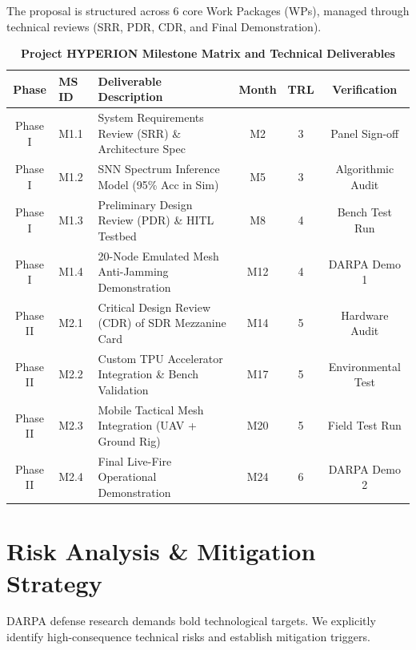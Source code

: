 \documentclass[10pt,a4paper]{article}
\begin{document}
The proposal is structured across 6 core Work Packages (WPs), managed through technical reviews (SRR, PDR, CDR, and Final Demonstration).

\vspace{2pt}

\begin{table}[h!]
\centering
\caption{\color{NavyPrimary}\bfseries Project HYPERION Milestone Matrix and Technical Deliverables}
\vspace{2pt}
\small
\begin{tabularx}{\linewidth}{@{}c l X c c c@{}}
\toprule
\rowcolor{LightBg}
\textbf{Phase} & \textbf{MS ID} & \textbf{Deliverable Description} & \textbf{Month} & \textbf{TRL} & \textbf{Verification} \\
\midrule
Phase I & M1.1 & System Requirements Review (SRR) \& Architecture Spec & M2 & 3 & Panel Sign-off \\
Phase I & M1.2 & SNN Spectrum Inference Model (95\% Acc in Sim) & M5 & 3 & Algorithmic Audit \\
Phase I & M1.3 & Preliminary Design Review (PDR) \& HITL Testbed & M8 & 4 & Bench Test Run \\
Phase I & M1.4 & 20-Node Emulated Mesh Anti-Jamming Demonstration & M12 & 4 & DARPA Demo 1 \\
\midrule
Phase II & M2.1 & Critical Design Review (CDR) of SDR Mezzanine Card & M14 & 5 & Hardware Audit \\
Phase II & M2.2 & Custom TPU Accelerator Integration \& Bench Validation & M17 & 5 & Environmental Test \\
Phase II & M2.3 & Mobile Tactical Mesh Integration (UAV + Ground Rig) & M20 & 5 & Field Test Run \\
Phase II & M2.4 & Final Live-Fire Operational Demonstration & M24 & 6 & DARPA Demo 2 \\
\bottomrule
\end{tabularx}
\end{table}

\section{Risk Analysis \& Mitigation Strategy}

DARPA defense research demands bold technological targets. We explicitly identify high-consequence technical risks and establish mitigation triggers.
\end{document}
